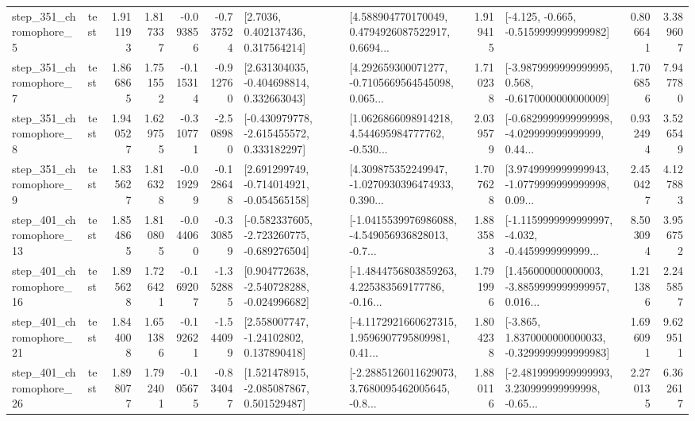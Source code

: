 \begin{tabular}{llrrrrllrlrr}
   step\_351\_chromophore\_5 &      test &      1.911193 &    1.817337 &     -0.093856 & -0.737524 &          [2.7036, 0.402137436, 0.317564214] &  [4.588904770170049, 0.4794926087522917, 0.6694... &       1.919415 &              [-4.125, -0.665, -0.5159999999999982] &            0.806641 &          3.389607 \\
   step\_351\_chromophore\_7 &      test &      1.866865 &    1.751552 &     -0.115314 & -0.912760 &    [2.631304035, -0.404698814, 0.332663043] &  [4.292659300071277, -0.7105669564545098, 0.065... &       1.710238 &  [-3.9879999999999995, 0.568, -0.6170000000000009] &            1.706856 &          7.947780 \\
   step\_351\_chromophore\_8 &      test &      1.940527 &    1.629755 &     -0.310771 & -2.508980 &   [-0.430979778, -2.615455572, 0.333182297] &  [1.0626866098914218, 4.544695984777762, -0.530... &       2.039579 &  [-0.6829999999999998, -4.029999999999999, 0.44... &            0.932494 &          3.526549 \\
   step\_351\_chromophore\_9 &      test &      1.835627 &    1.816328 &     -0.019299 & -0.128648 &   [2.691299749, -0.714014921, -0.054565158] &  [4.309875352249947, -1.0270930396474933, 0.390... &       1.707628 &  [3.9749999999999943, -1.0779999999999998, 0.09... &            2.450427 &          4.127883 \\
  step\_401\_chromophore\_13 &      test &      1.854865 &    1.810805 &     -0.044060 & -0.330859 &  [-0.582337605, -2.723260775, -0.689276504] &  [-1.0415539976986088, -4.549056936828013, -0.7... &       1.883583 &  [-1.1159999999999997, -4.032, -0.4459999999999... &            8.503094 &          3.956752 \\
  step\_401\_chromophore\_16 &      test &      1.895628 &    1.726421 &     -0.169207 & -1.352885 &   [0.904772638, -2.540728288, -0.024996682] &  [-1.4844756803859263, 4.225383569177786, -0.16... &       1.791996 &  [1.456000000000003, -3.8859999999999957, 0.016... &            1.211386 &          2.245857 \\
  step\_401\_chromophore\_21 &      test &      1.844008 &    1.651386 &     -0.192621 & -1.544099 &     [2.558007747, -1.24102802, 0.137890418] &  [-4.1172921660627315, 1.9596907795809981, 0.41... &       1.804238 &  [-3.865, 1.8370000000000033, -0.3299999999999983] &            1.696091 &          9.629511 \\
  step\_401\_chromophore\_26 &      test &      1.898077 &    1.792401 &     -0.105675 & -0.834047 &    [1.521478915, -2.085087867, 0.501529487] &  [-2.2885126011629073, 3.7680095462005645, -0.8... &       1.880116 &  [-2.4819999999999993, 3.230999999999998, -0.65... &            2.270135 &          6.362617 \\

\end{tabular}
